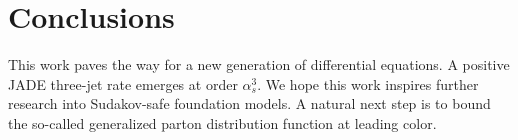 \section{Conclusions}\label{sec:conclusions}

This work paves the way for a new generation of differential equations.
A positive JADE three-jet rate emerges at order $\alpha_s^3$. We hope
this work inspires further research into Sudakov-safe foundation models.
A natural next step is to bound the so-called generalized parton
distribution function at leading color.


